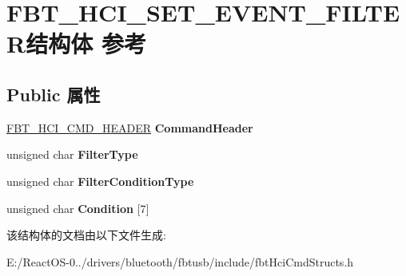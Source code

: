 \hypertarget{struct_f_b_t___h_c_i___s_e_t___e_v_e_n_t___f_i_l_t_e_r}{}\section{F\+B\+T\+\_\+\+H\+C\+I\+\_\+\+S\+E\+T\+\_\+\+E\+V\+E\+N\+T\+\_\+\+F\+I\+L\+T\+E\+R结构体 参考}
\label{struct_f_b_t___h_c_i___s_e_t___e_v_e_n_t___f_i_l_t_e_r}
\subsection*{Public 属性}
\begin{DoxyCompactItemize}
\item 
\mbox{\label{struct_f_b_t___h_c_i___s_e_t___e_v_e_n_t___f_i_l_t_e_r_ae6a9860305feebcd58887f948dbf27bc}} 
\hyperlink{struct_f_b_t___h_c_i___c_m_d___h_e_a_d_e_r}{F\+B\+T\+\_\+\+H\+C\+I\+\_\+\+C\+M\+D\+\_\+\+H\+E\+A\+D\+ER} {\bfseries Command\+Header}
\item 
\mbox{\label{struct_f_b_t___h_c_i___s_e_t___e_v_e_n_t___f_i_l_t_e_r_aa09a863b68ee8daa79311c3638fbfd13}} 
unsigned char {\bfseries Filter\+Type}
\item 
\mbox{\label{struct_f_b_t___h_c_i___s_e_t___e_v_e_n_t___f_i_l_t_e_r_a98d07d5f6bfe7ef88fdbcc24950b1bdf}} 
unsigned char {\bfseries Filter\+Condition\+Type}
\item 
\mbox{\label{struct_f_b_t___h_c_i___s_e_t___e_v_e_n_t___f_i_l_t_e_r_a03c70a703fe8ad899195f27e54932c25}} 
unsigned char {\bfseries Condition} \mbox{[}7\mbox{]}
\end{DoxyCompactItemize}


该结构体的文档由以下文件生成\+:\begin{DoxyCompactItemize}
\item 
E\+:/\+React\+O\+S-\/0../drivers/bluetooth/fbtusb/include/fbt\+Hci\+Cmd\+Structs.\+h\end{DoxyCompactItemize}
